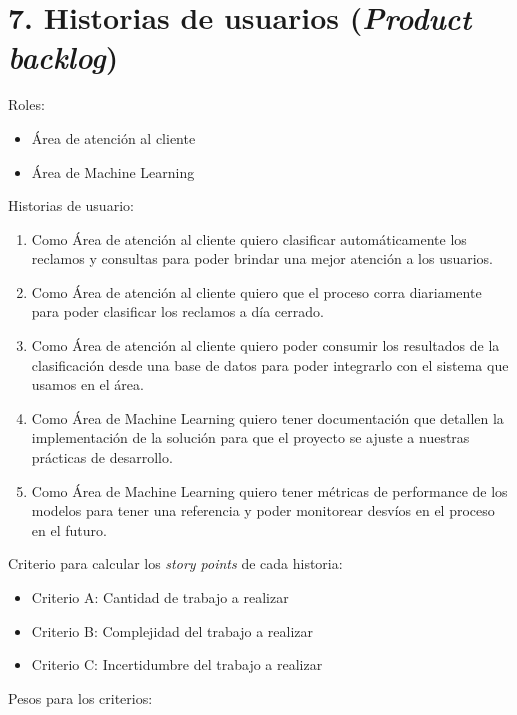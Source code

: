 \documentclass[
11pt, %
]{charter}
\begin{document}

\section{7. Historias de usuarios (\textit{Product backlog})}
\label{sec:backlog}

Roles:
\begin{itemize}
	\item Área de atención al cliente
	\item Área de Machine Learning
\end{itemize}

Historias de usuario:

\begin{enumerate}
	\item Como Área de atención al cliente quiero clasificar automáticamente los reclamos y consultas para poder brindar una mejor atención a los usuarios.
	\item Como Área de atención al cliente quiero que el proceso corra diariamente para poder clasificar los reclamos a día cerrado.
	\item Como Área de atención al cliente quiero poder consumir los resultados de la clasificación desde una base de datos para poder integrarlo con el sistema que usamos en el área.
	\item Como Área de Machine Learning quiero tener documentación que detallen la implementación de la solución para que el proyecto se ajuste a nuestras prácticas de desarrollo.
	\item Como Área de Machine Learning quiero tener métricas de performance de los modelos para tener una referencia y poder monitorear desvíos en el proceso en el futuro.
	
\end{enumerate}

Criterio para calcular los \textit{story points} de cada historia:

\begin{itemize}
	\item Criterio A: Cantidad de trabajo a realizar
	\item Criterio B: Complejidad del trabajo a realizar
	\item Criterio C: Incertidumbre del trabajo a realizar
\end{itemize}

Pesos para los criterios:
\end{document}
